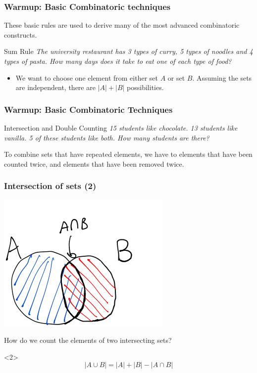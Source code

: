 \documentclass{beamer}
\begin{document}
\begin{frame}
  \frametitle{Warmup: Basic Combinatoric techniques}
  \begin{block}{}
    These basic rules are used to derive many of the most advanced
    combinatoric constructs.
  \end{block}
  \begin{block}{Sum Rule}
    \emph{The university restaurant has 3 types of curry, 5 types of
      noodles and 4 types of pasta. How many days does it take to eat
      one of each type of food?}
  \end{block}
  \vfill
  {\small
  \begin{itemize}
  \item {} We want to choose one element from
    either set $A$ or set $B$. Assuming the sets are independent,
    there are $|A|+|B|$ possibilities.
  \end{itemize}
  }
\end{frame}

\begin{frame}
  \frametitle{Warmup: Basic Combinatoric Techniques}
  \begin{block}{Intersection and Double Counting}
    \emph{15 students like chocolate. 13 students like vanilla. 5 of
      these students like both. How many students are there?
    }
  \end{block}
  \bigskip

  To combine sets that have repeated elements, we have to
   elements that have been counted twice, and
   elements that have been removed twice.
\end{frame}

\begin{frame}
  \frametitle{Intersection of sets (2)}

  \includegraphics[height=0.4\textheight]{img/intersec1}
  \begin{block}{}
    How do we count the elements of two intersecting sets?
  \end{block}

  \begin{onlyenv}<2>
    \begin{equation*}
      |A\cup B| = |A| + |B| - |A \cap B|
    \end{equation*}
  \end{onlyenv}
\end{frame}
\end{document}
